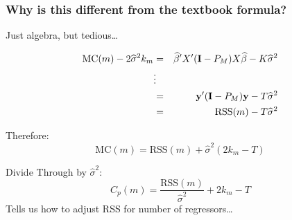 \begin{frame}
  \frametitle{Why is this different from the textbook formula?}

  \vspace{-1em}

  \begin{block}{Just algebra, but tedious\dots}

    \vspace{-2em}

   \small 
\begin{eqnarray*}
  \vspace{-1em}
  \text{MC}(m) - 2\widehat{\sigma}^2 k_m &=& \widehat{\beta}'X'(\mathbf{I} - P_M)X\widehat{\beta} - K\widehat{\sigma}^2\\
			&\vdots& \\
			&=& \mathbf{y}'(\mathbf{I} - P_M)\mathbf{y} - T\widehat{\sigma}^2\\
      &=& \text{RSS}(m) - T\widehat{\sigma}^2
      \end{eqnarray*}
  \end{block}

  \vspace{-2em}

  \pause

  \begin{block}{Therefore:}
    \vspace{-1.5em}
    \small
   \[
     \text{MC}(m) = \text{RSS}(m) + \widehat{\sigma}^2(2 k_m - T)
   \]
  \end{block}


  \vspace{-1em}

  \pause

  \begin{block}{Divide Through by $\widehat{\sigma}^2$:}
    \vspace{-1em}
    \small
  \[
    C_p(m) = \frac{\text{RSS}(m)}{\widehat{\sigma}^2} + 2k_m - T
  \]
  Tells us how to adjust RSS for number of regressors\dots
  \end{block}
\end{frame}
